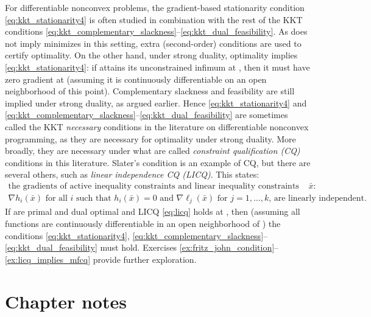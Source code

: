 For differentiable nonconvex problems, the gradient-based stationarity condition
\eqref{eq:kkt_stationarity4} is often studied in combination with the rest of
the KKT conditions
\eqref{eq:kkt_complementary_slackness}--\eqref{eq:kkt_dual_feasibility}. As
 does not imply
 minimizes  in this
setting, extra (second-order) conditions are used to certify optimality. On the
other hand, under strong duality, optimality implies
\eqref{eq:kkt_stationarity4}: if  attains
its unconstrained infimum at , then it must have zero gradient
at  (assuming it is continuously differentiable on an open
neighborhood of this point). Complementary slackness and feasibility are still
implied under strong duality, as argued earlier. Hence
\eqref{eq:kkt_stationarity4} and
\eqref{eq:kkt_complementary_slackness}--\eqref{eq:kkt_dual_feasibility} are
sometimes called the KKT \emph{necessary} conditions in the literature on
differentiable nonconvex programming, as they are necessary for optimality under
strong duality. More broadly, they are necessary under what are called
\emph{constraint qualification (CQ)} conditions in this literature. Slater's
condition is an example of CQ, but there are several others, such as
\emph{linear independence CQ (LICQ)}. This states:   
\begin{multline}
\label{eq:licq} 
\text{the gradients of active inequality constraints and linear
  inequality constraints at $\bar{x}$:} \\ \text{$\nabla h_i(\bar{x})$ for all 
  $i$ such that $h_i(\bar{x}) = 0$ and $\nabla \ell_j(\bar{x})$ for $j =
  1,\dots,k$, are linearly independent.}   
\end{multline}
If  are primal and dual optimal and LICQ
\eqref{eq:licq} holds at , then (assuming all functions are
continuously differentiable in an open neighborhood of ) the
conditions \eqref{eq:kkt_stationarity4},
\eqref{eq:kkt_complementary_slackness}--\eqref{eq:kkt_dual_feasibility} must
hold. Exercises \ref{ex:fritz_john_condition}--\ref{ex:licq_implies_mfcq}
provide further exploration.  


\SkipTocEntry\section*{Chapter notes}

